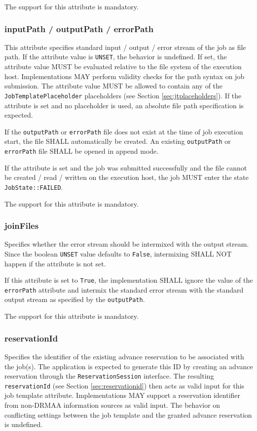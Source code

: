 \documentclass{article}
\newcommand{\h}[1]{\lstinline|#1|}
\begin{document}
The support for this attribute is mandatory.

\subsubsection{inputPath / outputPath / errorPath}

This attribute specifies standard input / output / error stream of the job as file path. If the attribute value is \h{UNSET}, the behavior is undefined. If set, the attribute value MUST be evaluated relative to the file system of the execution host. Implementations MAY perform validity checks for the path syntax on job submission. The attribute value MUST be allowed to contain any of the \h{JobTemplatePlaceholder} placeholders (see Section \ref{sec:jtplaceholders}). If the attribute is set and no placeholder is used, an absolute file path specification is expected. 

If the \h{outputPath} or \h{errorPath} file does not exist at the time of job execution start, the file SHALL automatically be created. An existing \h{outputPath} or \h{errorPath} file SHALL be opened in append mode.

If the attribute is set and the job was submitted successfully and the file cannot be created / read / written on the execution host, the job MUST enter the state \h{JobState::FAILED}.

The support for this attribute is mandatory.

\subsubsection{joinFiles}

Specifies whether the error stream should be intermixed with the output stream. Since the boolean \h{UNSET} value defaults to \h{False}, intermixing SHALL NOT happen if the attribute is not set. 

If this attribute is set to \h{True}, the implementation SHALL ignore the value of the \h{errorPath} attribute and intermix the standard error stream with the standard output stream as specified by the \h{outputPath}.

The support for this attribute is mandatory.

\subsubsection{reservationId}

Specifies the identifier of the existing advance reservation to be associated with the job(s). The application is expected to generate this ID by creating an advance reservation through the \h{ReservationSession} interface. The resulting \h{reservationId} (see Section \ref{sec:reservationid}) then acts as valid input for this job template attribute. Implementations MAY support a reservation identifier from non-DRMAA information sources as valid input. The behavior on conflicting settings between the job template and the granted advance reservation is undefined.
\end{document}
